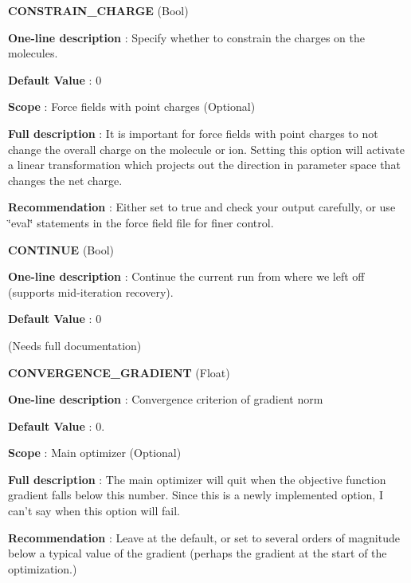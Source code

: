 \begin{DoxyItemize}
\item {\bfseries  C\-O\-N\-S\-T\-R\-A\-I\-N\-\_\-\-C\-H\-A\-R\-G\-E } (Bool) \par
{\bfseries  One-\/line description }\-: Specify whether to constrain the charges on the molecules. \par
{\bfseries  Default Value }\-: 0 \par
{\bfseries  Scope }\-: Force fields with point charges (Optional) \par
{\bfseries  Full description }\-: It is important for force fields with point charges to not change the overall charge on the molecule or ion. Setting this option will activate a linear transformation which projects out the direction in parameter space that changes the net charge. \par
{\bfseries  Recommendation }\-: Either set to true and check your output carefully, or use \char`\"{}eval\char`\"{} statements in the force field file for finer control.\end{DoxyItemize}
\begin{DoxyItemize}
\item {\bfseries  C\-O\-N\-T\-I\-N\-U\-E } (Bool) \par
{\bfseries  One-\/line description }\-: Continue the current run from where we left off (supports mid-\/iteration recovery). \par
{\bfseries  Default Value }\-: 0 \par
(Needs full documentation)\end{DoxyItemize}
\begin{DoxyItemize}
\item {\bfseries  C\-O\-N\-V\-E\-R\-G\-E\-N\-C\-E\-\_\-\-G\-R\-A\-D\-I\-E\-N\-T } (Float) \par
{\bfseries  One-\/line description }\-: Convergence criterion of gradient norm \par
{\bfseries  Default Value }\-: 0. \par
{\bfseries  Scope }\-: Main optimizer (Optional) \par
{\bfseries  Full description }\-: The main optimizer will quit when the objective function gradient falls below this number. Since this is a newly implemented option, I can't say when this option will fail. \par
{\bfseries  Recommendation }\-: Leave at the default, or set to several orders of magnitude below a typical value of the gradient (perhaps the gradient at the start of the optimization.)\end{DoxyItemize}
